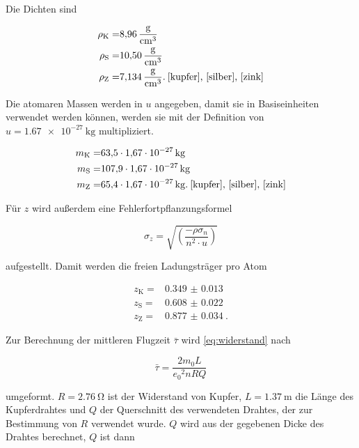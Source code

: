 Die Dichten sind

\begin{align}
    \rho _\text{K} =& \SI{8.96}{\gram\per\cubic\centi\meter} \\
    \rho _\text{S} =& \SI{10.50}{\gram\per\cubic\centi\meter} \\
    \rho _\text{Z} =& \SI{7.134}{\gram\per\cubic\centi\meter}.\:\text{\cite{kupfer}, \cite{silber}, \cite{zink}}
    \label{eq:rho}
\end{align}

Die atomaren Massen werden in $u$ angegeben, damit sie in Basiseinheiten verwendet werden können, werden sie mit der Definition von $u = \SI{1.67e-27}{\kilo\gram}$ multipliziert.\cite{physics_constants}

\begin{align}
    m_\text{K} =& \SI{63.5}{} \cdot \SI{1.67e-27}{\kilo\gram} \\
    m_\text{S} =& \SI{107.9}{} \cdot \SI{1.67e-27}{\kilo\gram} \\
    m_\text{Z} =& \SI{65.4}{} \cdot \SI{1.67e-27}{\kilo\gram}.\:\text{\cite{kupfer}, \cite{silber}, \cite{zink}}
    \label{eq:m}
\end{align}

Für $z$ wird außerdem eine Fehlerfortpflanzungsformel

\begin{equation}
   \sigma _z = \sqrt{\left(\frac{-\rho \sigma _n}{n^2 \cdot u}\right)}
    \label{eq:nproatom_fehler}
\end{equation}

aufgestellt.
Damit werden die freien Ladungsträger pro Atom

\begin{align*}
    z_\text{K} =& \SI{0.349(13)}{} \\
    z_\text{S} =& \SI{0.608(22)}{} \\
    z_\text{Z} =& \SI{0.877(34)}{}.
\end{align*}

Zur Berechnung der mittleren Flugzeit $\bar{\tau}$ wird \autoref{eq:widerstand} nach

\begin{equation}
    \bar{\tau} = \frac{2m_0 L}{{e_0}^2 n R Q}
    \label{eq:tau}
\end{equation}

umgeformt.
$R = \SI{2.76}{\ohm}$ ist der Widerstand von Kupfer, $L = \SI{1.37}{\meter}$ die Länge des Kupferdrahtes und $Q$ der Querschnitt des verwendeten Drahtes, der zur Bestimmung von $R$ verwendet wurde.
$Q$ wird aus der gegebenen Dicke des Drahtes berechnet, $Q$ ist dann

